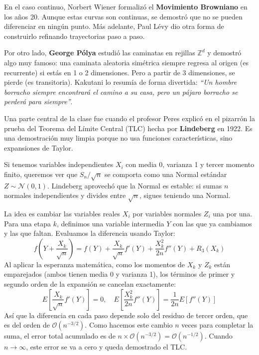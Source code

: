 \documentclass[11pt,letterpaper]{article}
\begin{document}
En el caso continuo, Norbert Wiener formalizó el \textbf{Movimiento Browniano} en los años 20. Aunque estas curvas son continuas, se demostró que no se pueden diferenciar en ningún punto. Más adelante, Paul Lévy dio otra forma de construirlo refinando trayectorias paso a paso.

Por otro lado, \textbf{George Pólya} estudió las caminatas en rejillas $\mathbb{Z}^d$ y demostró algo muy famoso: una caminata aleatoria simétrica siempre regresa al origen (es recurrente) si estás en 1 o 2 dimensiones. Pero a partir de 3 dimensiones, se pierde (es transitoria). Kakutani lo resumía de forma divertida: \textit{``Un hombre borracho siempre encontrará el camino a su casa, pero un pájaro borracho se perderá para siempre''}.

Una parte central de la clase fue cuando el profesor Peres explicó en el pizarrón la prueba del Teorema del Límite Central (TLC) hecha por \textbf{Lindeberg} en 1922. Es una demostración muy limpia porque no usa funciones características, sino expansiones de Taylor.

Si tenemos variables independientes $X_i$ con media 0, varianza 1 y tercer momento finito, queremos ver que $S_n / \sqrt{n}$ se comporta como una Normal estándar $Z \sim \mathcal{N}(0,1)$. Lindeberg aprovechó que la Normal es estable: si sumas $n$ normales independientes y divides entre $\sqrt{n}$, sigues teniendo una Normal.

La idea es cambiar las variables reales $X_i$ por variables normales $Z_i$ una por una. Para una etapa $k$, definimos una variable intermedia $Y$ con las que ya cambiamos y las que faltan. Evaluamos la diferencia usando Taylor:
\begin{equation}
f\left(Y + \frac{X_k}{\sqrt{n}}\right) = f(Y) + \frac{X_k}{\sqrt{n}}f'(Y) + \frac{X_k^2}{2n}f''(Y) + R_3(X_k)
\end{equation}
Al aplicar la esperanza matemática, como los momentos de $X_k$ y $Z_k$ están emparejados (ambos tienen media 0 y varianza 1), los términos de primer y segundo orden de la expansión se cancelan exactamente:
\begin{equation}
E\left[\frac{X_k}{\sqrt{n}}f'(Y)\right] = 0, \quad E\left[\frac{X_k^2}{2n}f''(Y)\right] = \frac{1}{2n}E[f''(Y)]
\end{equation}
Así que la diferencia en cada paso depende solo del residuo de tercer orden, que es del orden de $\mathcal{O}(n^{-3/2})$. Como hacemos este cambio $n$ veces para completar la suma, el error total acumulado es de $n \times \mathcal{O}(n^{-3/2}) = \mathcal{O}(n^{-1/2})$. Cuando $n \to \infty$, este error se va a cero y queda demostrado el TLC.
\end{document}
